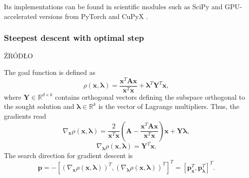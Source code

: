 Its implementations can be found in scientific modules such as SciPy \cite{scipy_lobpcg} and GPU-accelerated versions from PyTorch \cite{torch_lobpcg} and CuPyX \cite{cupy_lobpcg}.

\subsubsection{Steepest descent with optimal step}
ŹRÓDŁO \cite{pgd}

The goal function is defined as
\begin{equation}
	\rho\left(\mathbf{x}, \bm{\lambda} \right) = \frac{\mathbf{x}^T\mathbf{A}\mathbf{x}}{\mathbf{x}^T\mathbf{x}} + \bm{\lambda}^T \mathbf{Y}^T \mathbf{x}, 
\end{equation}
where $\mathbf{Y}\in\mathbb{R}^{d \times k}$ contains orthogonal vectors defining the subspace orthogonal to the sought solution and $\bm{\lambda}\in\mathbb{R}^k$ is the vector of Lagrange multipliers.
Thus, the gradients read
\begin{equation}
	\nabla_{\mathbf{x}}\rho\left(\mathbf{x},\bm{\lambda}\right) = \frac{2}{\mathbf{x}^T\mathbf{x}}\left(\mathbf{A}-\frac{\mathbf{x}^T\mathbf{A}\mathbf{x}}{\mathbf{x}^T\mathbf{x}}\right)\mathbf{x} + \mathbf{Y}\bm{\lambda},
\end{equation}
\begin{equation}
	\nabla_{\bm{\lambda}}\rho\left(\mathbf{x},\bm{\lambda}\right) = \mathbf{Y}^T\mathbf{x}.
\end{equation}
The search direction for gradient descent is
\begin{equation}
	\mathbf{p}=-\left[\left(\nabla_{\mathbf{x}}\rho\left(\mathbf{x},\bm{\lambda}\right)\right)^T, \left(\nabla_{\bm{\lambda}}\rho\left(\mathbf{x},\bm{\lambda}\right)\right)^T\right]^T = \left[\mathbf{p}_{\mathbf{x}}^T,\mathbf{p}_{\bm{\lambda}}^T\right]^T.
\end{equation}

